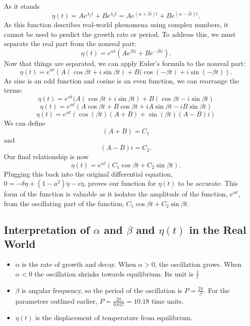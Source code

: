     As it stands
    \[
        \eta(t)=Ae^{\lambda_1t}+Be^{\lambda_2t}=Ae^{(\alpha+\beta i)t}+Be^{(\alpha-\beta i)t}.
    \]
    As this function describes real-world phenomena using complex numbers, it cannot be used to predict the growth rate or period. To address this, we must separate the real part from the nonreal part:
    \[
        \eta(t)=e^{\alpha t}\left(Ae^{\beta ti}+Be^{-\beta ti}\right).
    \]
    Now that things are separated, we can apply Euler's formula to the nonreal part:
    \[
        \eta(t)=e^{\alpha t}\left(A(\cos\beta t+ i\sin\beta t)+B(\cos(-\beta t)+i\sin(-\beta t) \right).
    \]
    As sine is an odd function and cosine is an even function, we can rearrange the terms:
    \[
        \eta(t)=e^{\alpha t}(A(\cos\beta t+ i\sin\beta t)+B(\cos\beta t-i\sin\beta t)
    \]
    \[
        \eta(t)=e^{\alpha t}(A\cos\beta t+B\cos\beta t + iA\sin\beta t-iB\sin\beta t)
    \]
    \[
        \eta(t)=e^{\alpha t}(\cos(\beta t)(A+B) + \sin(\beta t)(A-B)i)
    \]
    We can define
    \[
        (A+B)=C_1
    \]
    and
    \[
        (A-B)i=C_2.
    \]
    Our final relationship is now
    \[
        \eta(t)=e^{\alpha t}(C_1\cos\beta t+C_2\sin\beta t).
    \]
    Plugging this back into the original differential equation, $0=-\delta\eta+\left(1-a^2\right)\dot\eta-\epsilon\ddot\eta$, proves our function for $\eta(t)$ to be accurate. This form of the function is valuable as it isolates the amplitude of the function, $e^{\alpha t}$, from the oscillating part of the function, $C_1\cos\beta t+C_2\sin\beta t$.

    \subsection{Interpretation of $\alpha$ and $\beta$ and $\eta(t)$ in the Real World}\label{subsec:interpretation}

    \begin{itemize}
        \item $\alpha$ is the rate of growth and decay. When $\alpha>0$, the oscillation grows. When $\alpha<0$ the oscillation shrinks towards equilibrium. Its unit is $\frac{1}{t}$
        \item $\beta$ is angular frequency, so the period of the oscillation is $P=\frac{2\pi}{\beta}$. For the parameters outlined earlier, $P=\frac{2\pi}{0.617}=10.18$ time units.
        \item $\eta(t)$ is the displacement of temperature from equilibrium.
    \end{itemize}

